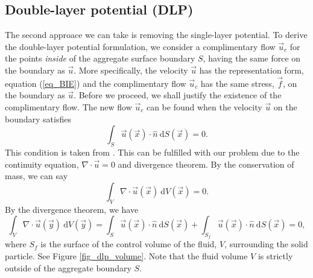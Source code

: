 \subsection{Double-layer potential (DLP)}
The second approace we can take is removing the single-layer potential. 
To derive the double-layer potential formulation, we consider a complimentary flow $\vec{u}_c$ 
for the points \textit{inside} of the aggregate surface boundary $S$, having the same force on the boundary as $\vec{u}$. More specifically, the velocity $\vec{u}$  has the representation form, equation (\ref{eq_BIE}) and the complimentary flow $\vec{u}_c$ has the same stress, $\vec{f}$, on the boundary as $\vec{u}$. Before we proceed, we shall justify the existence of the complimentary flow.
The new flow $\vec{u}_c$ can be found when the velocity $\vec{u}$ on the boundary satisfies
\begin{equation}
 	\int_S \vec{u}(\vec{x}) \cdot \hat{n} \ \text{d}S(\vec{x})=0. 
	\label{eq_dlp_constraint}
\end{equation}
This condition is taken from \cite{pozrikidis_boundary_1992}.
This can be fulfilled with our problem due to the continuity equation, $\nabla \cdot \vec{u}= 0$ and divergence theorem.
By the conservation of mass, we can say
\begin{equation}
 	\int_V  \nabla \cdot \vec{u}(\vec{x}) \ \text{d}V (\vec{x}) 
		=0. 
	\label{eq_constraint_v}
\end{equation}
By the divergence theorem, we have
\begin{equation}
	\int_V  \nabla \cdot \vec{u}(\vec{y}) \ \text{d}V (\vec{y})   = 
\int_{S } \vec{u}(\vec{x}) \cdot \hat{n} \ \text{d}S(\vec{x})
+ \int_{S_f} \vec{u}(\vec{x}) \cdot \hat{n} \ \text{d}S(\vec{x})=0,
\label{eq_div}
\end{equation}
where $S_f$ is the surface of the control volume of the fluid, $V$, surrounding the solid particle. See Figure \ref{fig_dlp_volume}.
Note that the fluid volume $V$ is strictly outside of the aggregate boundary $S$. 
